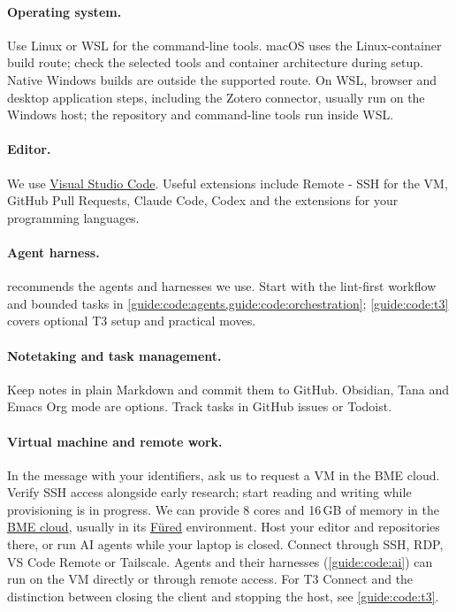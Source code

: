 \paragraph{Operating system.} Use Linux or WSL for the command-line tools. macOS uses the Linux-container build route; check the selected tools and container architecture during setup. Native Windows builds are outside the supported route. On WSL, browser and desktop application steps, including the Zotero connector, usually run on the Windows host; the repository and command-line tools run inside WSL.

\paragraph{Editor.} We use \href{https://code.visualstudio.com/}{Visual Studio Code}. Useful extensions include Remote - SSH for the VM, GitHub Pull Requests, Claude Code, Codex and the extensions for your programming languages.

\paragraph{Agent harness.}  recommends the agents and harnesses we use. Start with the lint-first workflow and bounded tasks in \cref{guide:code:agents,guide:code:orchestration}; \cref{guide:code:t3} covers optional T3 setup and practical moves.

\paragraph{Notetaking and task management.} Keep notes in plain Markdown and commit them to GitHub. Obsidian, Tana and Emacs Org mode are options. Track tasks in GitHub issues or Todoist.

\paragraph{Virtual machine and remote work.} In the message with your identifiers, ask us to request a VM in the BME cloud. Verify SSH access alongside early research; start reading and writing while provisioning is in progress. We can provide 8 cores and 16\,GB of memory in the \href{https://cloud.bme.hu/}{BME cloud}, usually in its \href{https://fured.cloud.bme.hu/}{Füred} environment. Host your editor and repositories there, or run AI agents while your laptop is closed. Connect through SSH, RDP, VS Code Remote or Tailscale. Agents and their harnesses (\cref{guide:code:ai}) can run on the VM directly or through remote access. For T3 Connect and the distinction between closing the client and stopping the host, see \cref{guide:code:t3}.

